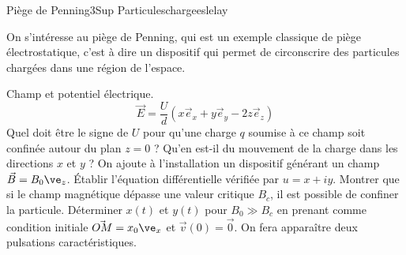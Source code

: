 \begin{exercise}{Piège de Penning}{3}{Sup}
{Particuleschargees}{lelay}

On s'intéresse au piège de Penning, qui est un exemple classique de piège électrostatique, c'est à dire un dispositif qui permet de circonscrire des particules chargées dans une région de l'espace.

\begin{questions}
    \questioncours Champ et potentiel électrique.
    $$
    \vec{E} = \frac{U}{d}(x\vec{e}_x+y\vec{e}_y-2z\vec{e}_z)
    $$
    \question Quel doit être le signe de $U$ pour qu'une charge $q$ soumise à ce champ soit confinée autour du plan $z = 0$ ? Qu'en est-il du mouvement de la charge dans les directions $x$ et $y$ ?
    \question On ajoute à l'installation un dispositif générant un champ $\vec{B} = B_0 \ve_z$. Établir l'équation différentielle vérifiée par $u = x + iy$.
    \question Montrer que si le champ magnétique dépasse une valeur critique $B_c$, il est possible de confiner la particule.
    \question Déterminer $x(t)$ et $y(t)$ pour $B_0 \gg B_c$ en prenant comme condition initiale $\vec{OM} = x_0 \ve_x$ et $\vec{v}(0) = \vec{0}$. On fera apparaître deux pulsations caractéristiques.
    
\end{questions}

\end{exercise}
